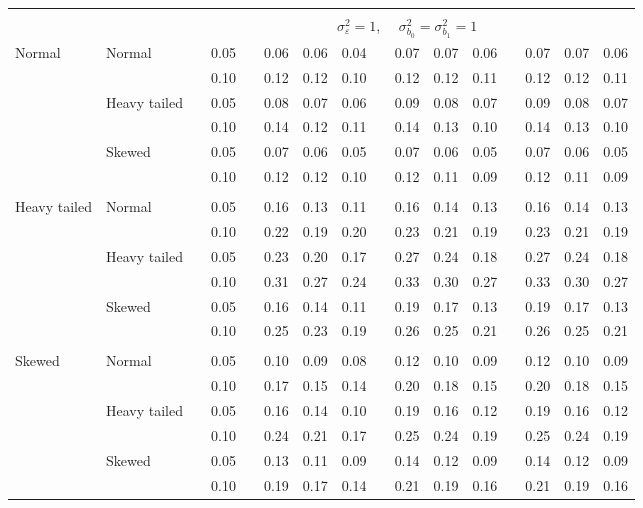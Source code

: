 \documentclass[12pt]{article} %
\begin{document}
\begin{table}[ht]
\begin{scriptsize}
\begin{center}
\begin{tabular}{ll p{.1cm} c p{.1cm} rrr p{.1cm} rrr p{.1cm} rrr}
&&&&&&&&&&&&&&&\\
& && && \multicolumn{9}{c}{$\sigma_{\varepsilon}^2 = 1$, \ \ $\sigma_{b_0}^2 = \sigma_{b_1}^2 = 1$} \\ \cline{6-16}
\rowcolor{gray!20}Normal       & Normal       && 0.05 &&   0.06 & 0.06 & 0.04 && 0.07 & 0.07 & 0.06 && 0.07 & 0.07 & 0.06 \\ 
\rowcolor{gray!20}             &              && 0.10 &&   0.12 & 0.12 & 0.10 && 0.12 & 0.12 & 0.11 && 0.12 & 0.12 & 0.11 \\ 
\rowcolor{gray!20}             & Heavy tailed && 0.05 &&   0.08 & 0.07 & 0.06 && 0.09 & 0.08 & 0.07 && 0.09 & 0.08 & 0.07 \\ 
\rowcolor{gray!20}             &              && 0.10 &&   0.14 & 0.12 & 0.11 && 0.14 & 0.13 & 0.10 && 0.14 & 0.13 & 0.10 \\ 
\rowcolor{gray!20}             & Skewed       && 0.05 &&   0.07 & 0.06 & 0.05 && 0.07 & 0.06 & 0.05 && 0.07 & 0.06 & 0.05 \\ 
\rowcolor{gray!20}             &              && 0.10 &&   0.12 & 0.12 & 0.10 && 0.12 & 0.11 & 0.09 && 0.12 & 0.11 & 0.09 \\ 
             &&&&&&&&&&&&&&&\\
Heavy tailed & Normal       && 0.05 &&   0.16 & 0.13 & 0.11 && 0.16 & 0.14 & 0.13 && 0.16 & 0.14 & 0.13 \\ 
             &              && 0.10 &&   0.22 & 0.19 & 0.20 && 0.23 & 0.21 & 0.19 && 0.23 & 0.21 & 0.19 \\ 
             & Heavy tailed && 0.05 &&   0.23 & 0.20 & 0.17 && 0.27 & 0.24 & 0.18 && 0.27 & 0.24 & 0.18 \\ 
             &              && 0.10 &&   0.31 & 0.27 & 0.24 && 0.33 & 0.30 & 0.27 && 0.33 & 0.30 & 0.27 \\ 
             & Skewed       && 0.05 &&   0.16 & 0.14 & 0.11 && 0.19 & 0.17 & 0.13 && 0.19 & 0.17 & 0.13 \\ 
             &              && 0.10 &&   0.25 & 0.23 & 0.19 && 0.26 & 0.25 & 0.21 && 0.26 & 0.25 & 0.21 \\ 
             &&&&&&&&&&&&&&&\\
Skewed       & Normal       && 0.05 &&   0.10 & 0.09 & 0.08 && 0.12 & 0.10 & 0.09 && 0.12 & 0.10 & 0.09 \\ 
             &              && 0.10 &&   0.17 & 0.15 & 0.14 && 0.20 & 0.18 & 0.15 && 0.20 & 0.18 & 0.15 \\ 
             & Heavy tailed && 0.05 &&   0.16 & 0.14 & 0.10 && 0.19 & 0.16 & 0.12 && 0.19 & 0.16 & 0.12 \\ 
             &              && 0.10 &&   0.24 & 0.21 & 0.17 && 0.25 & 0.24 & 0.19 && 0.25 & 0.24 & 0.19 \\ 
             & Skewed       && 0.05 &&   0.13 & 0.11 & 0.09 && 0.14 & 0.12 & 0.09 && 0.14 & 0.12 & 0.09 \\ 
             &              && 0.10 &&   0.19 & 0.17 & 0.14 && 0.21 & 0.19 & 0.16 && 0.21 & 0.19 & 0.16 \\ 



\end{tabular}
\end{center}
\end{scriptsize}
\end{table}
\end{document}

